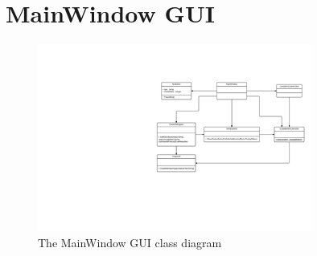 \section{MainWindow GUI}
\label{sec:mainwindow-class-diagram}

\begin{figure}[htb]
    \centering
    \includegraphics[width=0.8\textwidth]{Software_design/graphics/MainWindow.png}
    \caption{The MainWindow GUI class diagram}
    \label{fig:mainwindow-diagram}
\end{figure}
